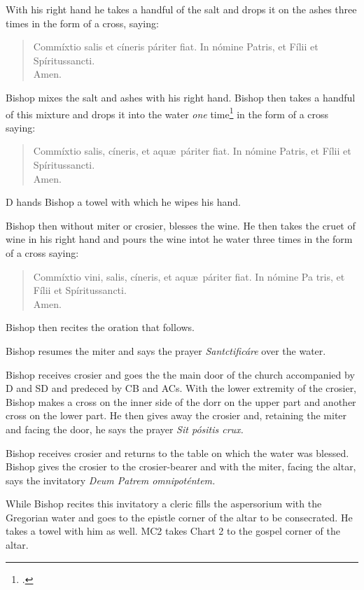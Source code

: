 \documentclass[letterpaper]{report}
\begin{document}
{\rubric With his right hand he takes a handful of the salt and drops it on the
ashes three times in the form of a cross, saying:

\begin{quote}
   Commíxtio salis et cíneris páriter fiat. In nómine Pa\cross tris, et
    Fí\cross lii et Spíritus\cross sancti. \\
   \rbar Amen.
\end{quote}

Bishop mixes the salt and ashes with his right hand. Bishop then takes a handful of this
mixture and drops it into the water \textit{one} time\footcite[The Pontifical
seems to indicate that the bishop performs this ceremony \textit{three times,}
but the authors imply that it is done only \textit{once.}][footnote 1, p.
60.]{consecranda} in the form of a cross saying:

\begin{quote}
    Commíxtio salis, cíneris, et aqu\ae\ páriter fiat. In nómine Pa\cross tris,
    et Fí\cross lii et Spíritus\cross sancti. \\
   \rbar Amen.
\end{quote}

D hands Bishop a towel with which he wipes his hand.

\rubric Bishop then without miter or crosier, blesses the wine. He then takes the
cruet of wine in his right hand and pours the wine intot he water three times
in the form of a cross saying:

\begin{quote}
    Commíxtio vini, salis, cíneris, et aqu\ae\ páriter fiat. In nómine Pa\cross
    tris, et Fí\cross lii et Spíritus\cross sancti. \\
   \rbar Amen.
\end{quote}

Bishop then recites the oration that follows.

\rubric Bishop resumes the miter and says the prayer \textit{Santcti\cross ficáre}
over the water.

\rubric Bishop receives crosier and goes the the main door of the church accompanied
by D and SD and predeced by CB and ACs. With the lower extremity of the
crosier, Bishop makes a cross on the inner side of the dorr on the upper part and
another cross on the lower part. He then gives away the crosier and, retaining
the miter and facing the door, he says the prayer \textit{Sit pósitis crux.}

\rubric Bishop receives crosier and returns to the table on which the water was
blessed. Bishop gives the crosier to the crosier-bearer and with the miter, facing
the altar, says the invitatory \textit{Deum Patrem omnipoténtem.}

While Bishop recites this invitatory a cleric fills the aspersorium with the
Gregorian water and goes to the epistle corner of the altar to be consecrated.
He takes a towel with him as well. MC2 takes Chart 2 to the gospel corner of
the altar.

}
\end{document}
